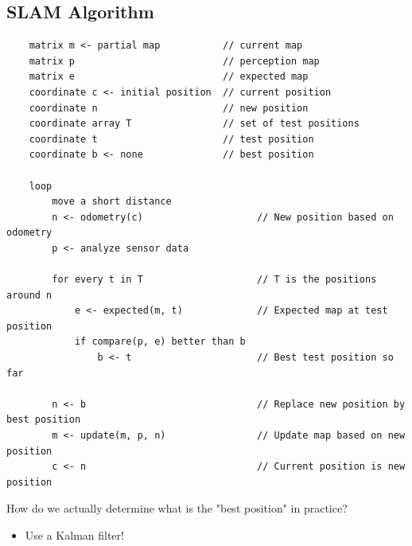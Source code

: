 \documentclass[10pt]{article}
\begin{document}
\subsection*{SLAM Algorithm}
\begin{verbatim}
    matrix m <- partial map           // current map
    matrix p                          // perception map
    matrix e                          // expected map
    coordinate c <- initial position  // current position
    coordinate n                      // new position
    coordinate array T                // set of test positions
    coordinate t                      // test position
    coordinate b <- none              // best position

    loop
        move a short distance
        n <- odometry(c)                    // New position based on odometry
        p <- analyze sensor data

        for every t in T                    // T is the positions around n
            e <- expected(m, t)             // Expected map at test position
            if compare(p, e) better than b
                b <- t                      // Best test position so far
        
        n <- b                              // Replace new position by best position
        m <- update(m, p, n)                // Update map based on new position
        c <- n                              // Current position is new position
\end{verbatim}

How do we actually determine what is the "best position" in practice?
\begin{itemize}
	\item Use a Kalman filter!
\end{itemize}
\end{document}

